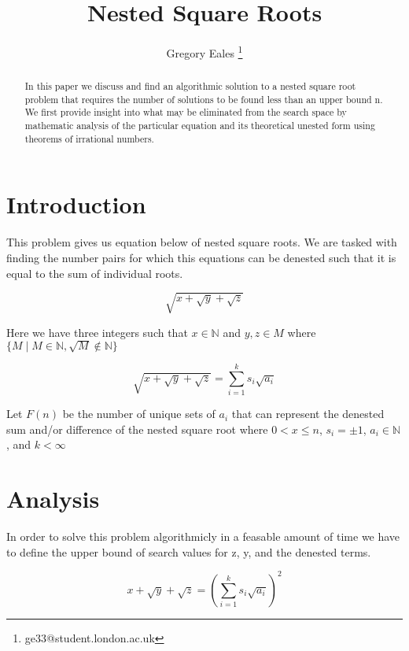\documentclass[12pt, letterpaper]{article}
\title{Nested Square Roots}
\author{Gregory Eales \thanks{ge33@student.london.ac.uk}}
\begin{document}
\maketitle

\begin{abstract}
In this paper we discuss and find an algorithmic solution to a nested square root problem that requires the number of solutions to be found less than an upper bound n. We first provide insight into what may be eliminated from the search space by mathematic analysis of the particular equation and its theoretical unested form using theorems of irrational numbers.



\end{abstract}

\section{Introduction}

This problem gives us equation below of nested square roots. We are tasked with finding the number pairs for which this equations can be denested such that it is equal to the sum of individual roots.

\begin{equation}
\sqrt{x + \sqrt{y} + \sqrt{z}}
\end{equation}

Here we have three integers such that $x \in  \mathbb{N}$ and $ y, z \in M$ where $  \{M \mid M \in \mathbb{N}, \sqrt{M} \notin\mathbb{N} \}$


\begin{equation}
\sqrt{x + \sqrt{y} + \sqrt{z}} = \sum_{i=1}^{k} s_{i} \sqrt{a_{i}}
\end{equation}

Let $F(n)$ be the number of unique sets of $a_{i}$ that can represent the denested sum and/or difference of the nested square root where $0 < x \leq n $, $s_{i} = \pm 1$, $a_{i} \in \mathbb{N}$, and $k < \infty$



\section{Analysis}

In order to solve this problem algorithmicly in a feasable amount of time we have to define the upper bound of search values for z, y, and the denested terms.

\begin{equation}
x + \sqrt{y} + \sqrt{z} = (\sum_{i=1}^{k} s_{i} \sqrt{a_{i}})^{2}
\end{equation}
\end{document}
